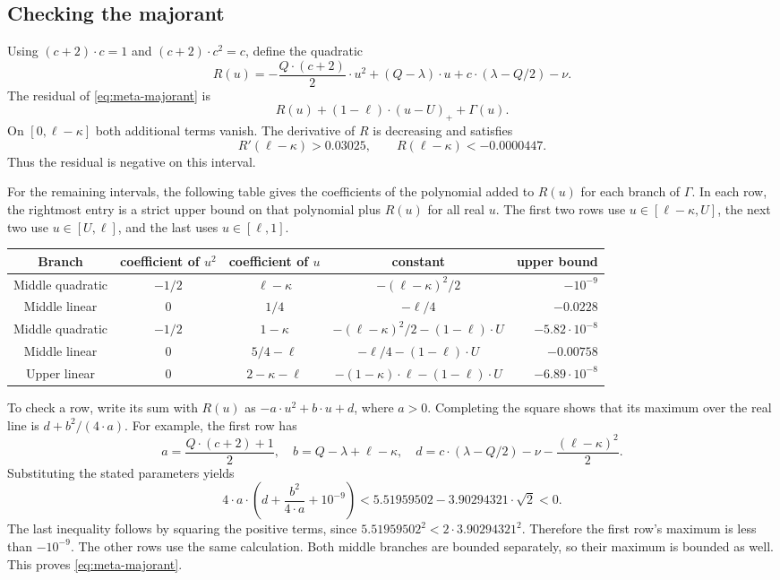 \subsection{Checking the majorant}

Using $(c+2)\cdot c=1$ and $(c+2)\cdot c^2=c$, define the quadratic
\[
 R(u)=-\frac{Q\cdot(c+2)}2\cdot u^2+(Q-\lambda)\cdot u
      +c\cdot(\lambda-Q/2)-\nu.
\]
The residual of \eqref{eq:meta-majorant} is
\[
 R(u)+(1-\ell)\cdot(u-U)_++\Gamma(u).
\]
On $[0,\ell-\kappa]$ both additional terms vanish. The derivative of $R$
is decreasing and satisfies
\[
 R'(\ell-\kappa)>0.03025,\qquad R(\ell-\kappa)<-0.0000447.
\]
Thus the residual is negative on this interval.

For the remaining intervals, the following table gives the coefficients
of the polynomial added to $R(u)$ for each branch of $\Gamma$. In each row,
the rightmost entry is a strict upper bound on that polynomial plus $R(u)$
for all real $u$. The first two rows use $u\in[\ell-\kappa,U]$, the next
two use $u\in[U,\ell]$, and the last uses $u\in[\ell,1]$.
\begin{center}
\small
\begin{tabular}{c|c|c|c|r}
 Branch & coefficient of $u^2$ & coefficient of $u$ & constant & upper bound\\ \hline
 Middle quadratic & $-1/2$ & $\ell-\kappa$ & $-(\ell-\kappa)^2/2$ & $-10^{-9}$\\
 Middle linear & $0$ & $1/4$ & $-\ell/4$ & $-0.0228$\\
 Middle quadratic & $-1/2$ & $1-\kappa$ & $-(\ell-\kappa)^2/2-(1-\ell)\cdot U$ & $-5.82\cdot10^{-8}$\\
 Middle linear & $0$ & $5/4-\ell$ & $-\ell/4-(1-\ell)\cdot U$ & $-0.00758$\\
 Upper linear & $0$ & $2-\kappa-\ell$ & $-(1-\kappa)\cdot\ell-(1-\ell)\cdot U$ & $-6.89\cdot10^{-8}$
\end{tabular}
\end{center}
To check a row, write its sum with $R(u)$ as $-a\cdot u^2+b\cdot u+d$,
where $a>0$. Completing the square shows that its maximum over the real
line is $d+b^2/(4\cdot a)$. For example, the first row has
\[
 a=\frac{Q\cdot(c+2)+1}{2},\quad
 b=Q-\lambda+\ell-\kappa,\quad
 d=c\cdot(\lambda-Q/2)-\nu-\frac{(\ell-\kappa)^2}{2}.
\]
Substituting the stated parameters yields
\[
 4\cdot a\cdot\left(d+\frac{b^2}{4\cdot a}+10^{-9}\right)
 <5.51959502-3.90294321\cdot\sqrt2<0.
\]
The last inequality follows by squaring the positive terms, since
$5.51959502^2<2\cdot3.90294321^2$. Therefore the first row's maximum is
less than $-10^{-9}$. The other rows use the same calculation. Both middle
branches are bounded separately, so their maximum is bounded as well.
This proves \eqref{eq:meta-majorant}.

